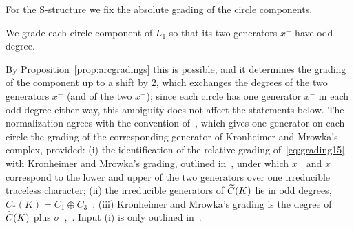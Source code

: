 For the S-structure we fix the absolute grading of the circle components.

\begin{definition}\label{def:circlenorm}
We grade each circle component of $L_1$ so that its two generators $x^-$ have odd degree.
\end{definition}

By Proposition~\ref{prop:arcgradings} this is possible, and it determines the grading of the component up to a shift
by $2$, which exchanges the degrees of the two generators $x^-$ (and of the two $x^+$); since each circle has one
generator $x^-$ in each odd degree either way, this ambiguity does not affect the statements below. The normalization agrees
with the convention of~\cite[\S6.1]{HHK2}, which gives one generator on each circle the grading of the
corresponding generator of Kronheimer and Mrowka's complex, provided:
(i) the identification of the relative grading of~\eqref{eq:grading15} with Kronheimer and Mrowka's grading,
outlined in~\cite[\S6.1]{HHK2}, under which $x^-$ and $x^+$ correspond to the lower and upper of the two
generators over one irreducible traceless character;
(ii) the irreducible generators of $\widetilde C(K)$ lie in odd degrees, $C_*(K)=C_1\oplus C_3$~\cite[\S1, Cor.~3]{DScaduto};
(iii) Kronheimer and Mrowka's grading is the degree of $\widetilde C(K)$ plus $\sigma$~\cite{W26},~\cite[Thm.~8.9]{DSEquiv}.
Input (i) is only outlined in~\cite{HHK2}.

